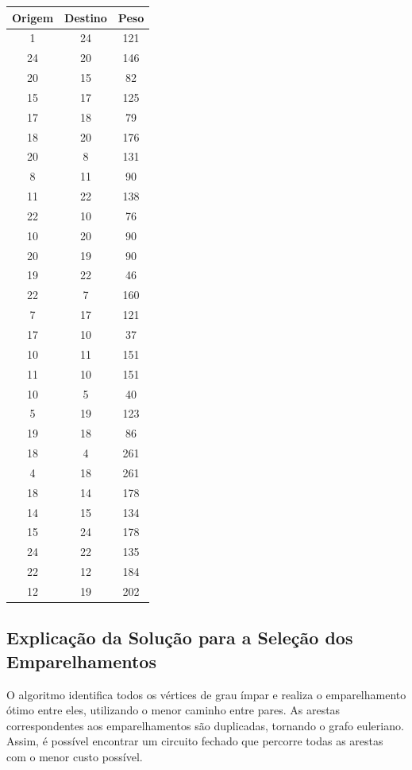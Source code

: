 \documentclass[12pt]{article}
\begin{document}
\begin{longtable}{|c|c|c|}
\hline Origem & Destino & Peso \\
\hline 1 & 24 & 121 \\
\hline 24 & 20 & 146 \\
\hline 20 & 15 & 82 \\
\hline 15 & 17 & 125 \\
\hline 17 & 18 & 79 \\
\hline 18 & 20 & 176 \\
\hline 20 & 8 & 131 \\
\hline 8 & 11 & 90 \\
\hline 11 & 22 & 138 \\
\hline 22 & 10 & 76 \\
\hline 10 & 20 & 90 \\
\hline 20 & 19 & 90 \\
\hline 19 & 22 & 46 \\
\hline 22 & 7 & 160 \\
\hline 7 & 17 & 121 \\
\hline 17 & 10 & 37 \\
\hline 10 & 11 & 151 \\
\hline 11 & 10 & 151 \\
\hline 10 & 5 & 40 \\
\hline 5 & 19 & 123 \\
\hline 19 & 18 & 86 \\
\hline 18 & 4 & 261 \\
\hline 4 & 18 & 261 \\
\hline 18 & 14 & 178 \\
\hline 14 & 15 & 134 \\
\hline 15 & 24 & 178 \\
\hline 24 & 22 & 135 \\
\hline 22 & 12 & 184 \\
\hline 12 & 19 & 202 \\
\hline\end{longtable}

\subsection{Explicação da Solução para a Seleção dos Emparelhamentos}
O algoritmo identifica todos os vértices de grau ímpar e realiza o emparelhamento ótimo entre eles, utilizando o menor caminho entre pares. As arestas correspondentes aos emparelhamentos são duplicadas, tornando o grafo euleriano. Assim, é possível encontrar um circuito fechado que percorre todas as arestas com o menor custo possível.
\end{document}
